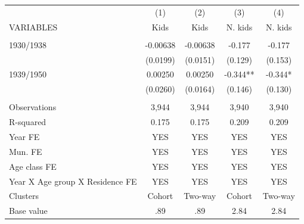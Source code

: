 \begin{tabular}{lcccc} \hline
 & (1) & (2) & (3) & (4) \\
VARIABLES & Kids & Kids & N. kids & N. kids \\ \hline
 &  &  &  &  \\
1930/1938 & -0.00638 & -0.00638 & -0.177 & -0.177 \\
 & (0.0199) & (0.0151) & (0.129) & (0.153) \\
1939/1950 & 0.00250 & 0.00250 & -0.344** & -0.344* \\
 & (0.0260) & (0.0164) & (0.146) & (0.130) \\
 &  &  &  &  \\
Observations & 3,944 & 3,944 & 3,940 & 3,940 \\
R-squared & 0.175 & 0.175 & 0.209 & 0.209 \\
Year FE & YES & YES & YES & YES \\
Mun. FE & YES & YES & YES & YES \\
Age class FE & YES & YES & YES & YES \\
Year X Age group X Residence FE & YES & YES & YES & YES \\
Clusters & Cohort & Two-way & Cohort & Two-way \\
 Base value & .89 & .89 & 2.84 & 2.84 \\ \hline
\end{tabular}
